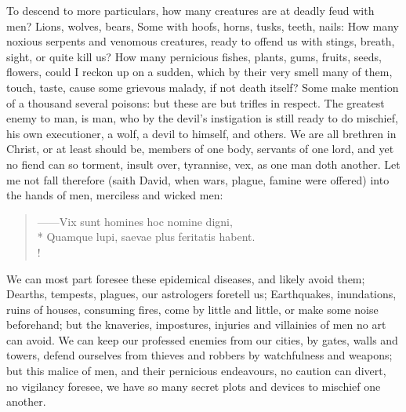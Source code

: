 

To descend to more particulars, how many creatures are at deadly feud with men?
Lions, wolves, bears, \etc{} Some with hoofs, horns, tusks, teeth, nails: How
many noxious serpents and venomous creatures, ready to offend us with stings,
breath, sight, or quite kill us? How many pernicious fishes, plants, gums,
fruits, seeds, flowers, \etc{} could I reckon up on a sudden, which by their
very smell many of them, touch, taste, cause some grievous malady, if not death
itself? Some make mention of a thousand several poisons: but these are but
trifles in respect. The greatest enemy to man, is man, who by the devil's
instigation is still ready to do mischief, his own executioner, a wolf, a devil
to himself, and others. We are all brethren in Christ, or
at least should be, members of one body, servants of one lord, and yet no fiend
can so torment, insult over, tyrannise, vex, as one man doth another. Let me
not fall therefore (saith David, when wars, plague, famine were offered) into
the hands of men, merciless and wicked men:

\begin{latin}
\begin{verse}%
------Vix sunt homines hoc nomine digni,\\*
Quamque lupi, saevae plus feritatis habent.\\!
\end{verse}%
\end{latin}

We can most part foresee these epidemical diseases, and likely avoid them;
Dearths, tempests, plagues, our astrologers foretell us; Earthquakes,
inundations, ruins of houses, consuming fires, come by little and little, or
make some noise beforehand; but the knaveries, impostures, injuries and
villainies of men no art can avoid. We can keep our professed enemies from our
cities, by gates, walls and towers, defend ourselves from thieves and robbers
by watchfulness and weapons; but this malice of men, and their pernicious
endeavours, no caution can divert, no vigilancy foresee, we have so many secret
plots and devices to mischief one another.

